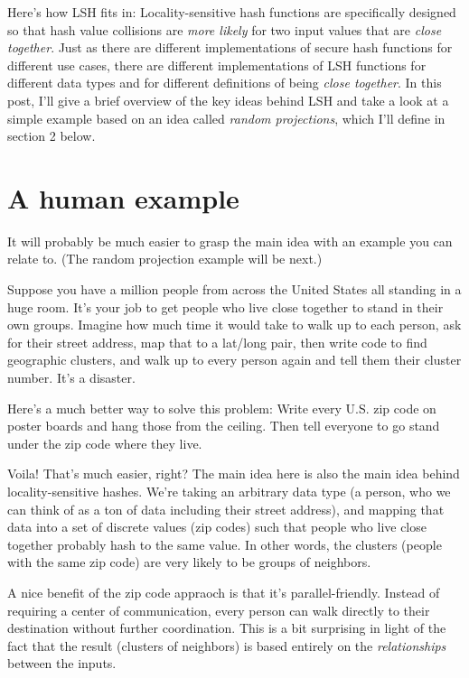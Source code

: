 \documentclass[20pt,]{extarticle}
\begin{document}
Here's how LSH fits in: Locality-sensitive hash functions are
specifically designed so that hash value collisions are \emph{more
likely} for two input values that are \emph{close together}. Just as
there are different implementations of secure hash functions for
different use cases, there are different implementations of LSH
functions for different data types and for different definitions of
being \emph{close together}. In this post, I'll give a brief overview of
the key ideas behind LSH and take a look at a simple example based on an
idea called \emph{random projections}, which I'll define in section 2
below.

\section{A human example}\label{a-human-example}

It will probably be much easier to grasp the main idea with an example
you can relate to. (The random projection example will be next.)

Suppose you have a million people from across the United States all
standing in a huge room. It's your job to get people who live close
together to stand in their own groups. Imagine how much time it would
take to walk up to each person, ask for their street address, map that
to a lat/long pair, then write code to find geographic clusters, and
walk up to every person again and tell them their cluster number. It's a
disaster.

Here's a much better way to solve this problem: Write every U.S. zip
code on poster boards and hang those from the ceiling. Then tell
everyone to go stand under the zip code where they live.

Voila! That's much easier, right? The main idea here is also the main
idea behind locality-sensitive hashes. We're taking an arbitrary data
type (a person, who we can think of as a ton of data including their
street address), and mapping that data into a set of discrete values
(zip codes) such that people who live close together probably hash to
the same value. In other words, the clusters (people with the same zip
code) are very likely to be groups of neighbors.

A nice benefit of the zip code appraoch is that it's parallel-friendly.
Instead of requiring a center of communication, every person can walk
directly to their destination without further coordination. This is a
bit surprising in light of the fact that the result (clusters of
neighbors) is based entirely on the \emph{relationships} between the
inputs.
\end{document}
